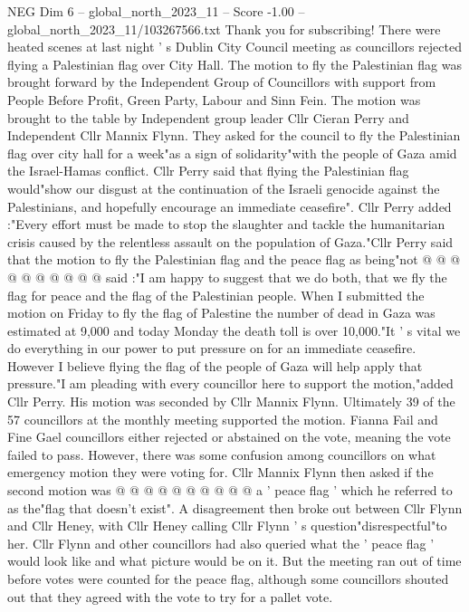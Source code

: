 \begin{textsample}{NEG Dim 6 – global\_north\_2023\_11 – Score -1.00 – global\_north\_2023\_11/103267566.txt}  \label{ex:f6_neg_226}
Thank you for subscribing!
There were heated scenes at last night ' s Dublin City Council meeting as councillors rejected flying a Palestinian flag over City Hall.
The motion to fly the Palestinian flag was brought forward by the Independent Group of Councillors with support from People Before Profit, Green Party, Labour and Sinn Fein.
The motion was brought to the table by Independent group leader Cllr Cieran Perry and Independent Cllr Mannix Flynn.
They asked for the council to fly the Palestinian flag over city hall for a week"as a sign of solidarity"with the people of Gaza amid the Israel-Hamas conflict.
Cllr Perry said that flying the Palestinian flag would"show our disgust at the continuation of the Israeli genocide against the Palestinians, and hopefully encourage an immediate ceasefire".
Cllr Perry added :"Every effort must be made to stop the slaughter and tackle the humanitarian crisis caused by the relentless assault on the population of Gaza."Cllr Perry said that the motion to fly the Palestinian flag and the peace flag as being"not @ @ @ @ @ @ @ @ @ @ said :"I am happy to suggest that we do both, that we fly the flag for peace and the flag of the Palestinian people.
When I submitted the motion on Friday to fly the flag of Palestine the number of dead in Gaza was estimated at 9,000 and today Monday the death toll is over 10,000."It ' s vital we do everything in our power to put pressure on for an immediate ceasefire.
However I believe flying the flag of the people of Gaza will help apply that pressure."I am pleading with every councillor here to support the motion,"added Cllr Perry.
His motion was seconded by Cllr Mannix Flynn.
Ultimately 39 of the 57 councillors at the monthly meeting supported the motion.
Fianna Fail and Fine Gael councillors either rejected or abstained on the vote, meaning the vote failed to pass.
However, there was some confusion among councillors on what emergency motion they were voting for.
Cllr Mannix Flynn then asked if the second motion was @ @ @ @ @ @ @ @ @ @ a ' peace flag ' which he referred to as the"flag that doesn't exist".
A disagreement then broke out between Cllr Flynn and Cllr Heney, with Cllr Heney calling Cllr Flynn ' s question"disrespectful"to her.
Cllr Flynn and other councillors had also queried what the ' peace flag ' would look like and what picture would be on it.
But the meeting ran out of time before votes were counted for the peace flag, although some councillors shouted out that they agreed with the vote to try for a pallet vote.

\end{textsample}
